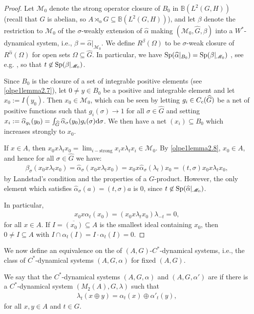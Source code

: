 \begin{proof}
Let $\mathscr{M}_0$ denote the strong operator closure of $B_0$ in $\mathbb{B}(L^2(G,H))$ (recall that $G$ is abelian, so $A \rtimes_\alpha G \subseteq \mathbb{B}(L^2(G,H))$), and let $\beta$ denote the restriction to $\mathscr{M}_0$ of the $\sigma$-weakly extension of $\hat \alpha$ making $(\mathscr{M}_0, \hat G, \beta)$ into a $W^*$-dynamical system, i.e., $\beta = \hat \alpha|_{\mathscr{M}_0}$. We define $R^{\beta}(\Omega)$ to be $\sigma$-weak closure of $R^{\hat \alpha}(\Omega)$ for open sets $\Omega \subseteq \hat G$. In particular, we have $\mathrm{Sp}(\widehat{\alpha}|_{B_0})= \mathrm{Sp}(\beta|_{\mathscr{M}_0})$ , see e.g. \cite[Proposition 8.8.9]{pedersenalgauto}, so that $t \not \in \mathrm{Sp}(\beta|_{\mathscr{M}_0})$.

Since $B_0$ is the closure of a set of integrable positive elements (see \cref{olpe1lemma2.7}), let $0 \neq y \in B_0$ be a positive and integrable element and let $x_0 := I(y_0)$. Then $x_0 \in \mathscr{M}_0$, which can be seen by letting $g_i \in C_c(\widehat{G})$ be a net of positive functions such that $g_i(\sigma)\to 1$ for all $\sigma \in \hat G$ and setting $x_i := \widehat{\alpha}_{g_i}(y_0) = \int_{\widehat{G}} \widehat{\alpha}_{\sigma}(y_0) g_i(\sigma) \mathrm{d} \sigma $. We then have a net $(x_i) \subseteq B_0$ which increases strongly to $x_0$. 

If $x \in A$, then $x_0 x \lambda_t x_0 = \lim_{i-\text{strong}} x_i x \lambda_t x_i \in \mathscr{M}_0$. By \cref{olpe1lemma2.8}, $x_0 \in A$, and hence for all $\sigma \in \hat G$ we have:
\begin{align*}
	\beta_{\sigma}(x_0 x \lambda_t x_0) = \hat \alpha_\sigma( x_0 x \lambda_t x_0) = x_0 x \hat \alpha_\sigma(\lambda_t) x_0 =  (t,\sigma) x_0 x \lambda_t x_0,
\end{align*}
by Landstad's condition and the properties of a $G$-product. However, the only element which satisfies $\hat \alpha_\sigma (a)=(t,\sigma) a$ is $0$, since $t \not \in \mathrm{Sp}(\widehat{\alpha} |_{\mathscr{M}_0})$.

In particular,
\begin{align*}
	x_0 x \alpha_t(x_0) = (x_0 x \lambda_t x_0) \lambda_{-t} = 0,
\end{align*}
for all $x \in A$. If $I = \overline{(x_0)} \subseteq A$ is the smallest ideal containing $x_0$, then $0 \neq I \subseteq A$ with $I \cap \alpha_t(I)=I\cdot\alpha_t(I)=0$.
\end{proof}
We now define an equivalence on the of $(A,G)$-$C^*$-dynamical systems, i.e., the class of $C^*$-dynamical systems $(A, G, \alpha)$ for fixed $(A,G)$. 
\begin{definition}
	We say that the $C^*$-dynamical systems $(A,G,\alpha)$ and $(A, G, \alpha')$ are  if there is a $C^*$-dynamical system $(M_2(A), G, \lambda)$ such that
	\begin{align*}
		\lambda_t (x \oplus y) = \alpha_t(x) \oplus \alpha'_t(y),
	\end{align*}
	for all $x,y \in A$ and $t \in G$.
\end{definition}
